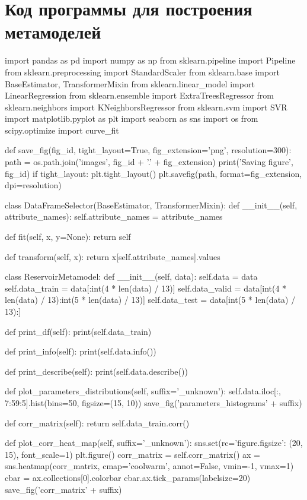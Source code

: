\chapter{Код программы для построения метамоделей}\label{appendix-MikTeX-TexStudio}

\begin{pythoncode}
import pandas as pd
import numpy as np
from sklearn.pipeline import Pipeline
from sklearn.preprocessing import StandardScaler
from sklearn.base import BaseEstimator, TransformerMixin
from sklearn.linear_model import LinearRegression
from sklearn.ensemble import ExtraTreesRegressor
from sklearn.neighbors import KNeighborsRegressor
from sklearn.svm import SVR
import matplotlib.pyplot as plt
import seaborn as sns
import os
from scipy.optimize import curve_fit


def save_fig(fig_id, tight_layout=True, fig_extension='png', resolution=300):
    path = os.path.join('images', fig_id + '.' + fig_extension)
    print('Saving figure', fig_id)
    if tight_layout:
        plt.tight_layout()
    plt.savefig(path, format=fig_extension, dpi=resolution)


class DataFrameSelector(BaseEstimator, TransformerMixin):
    def __init__(self, attribute_names):
        self.attribute_names = attribute_names

    def fit(self, x, y=None):
        return self

    def transform(self, x):
        return x[self.attribute_names].values


class ReservoirMetamodel:
    def __init__(self, data):
        self.data = data
        self.data_train = data[:int(4 * len(data) / 13)]
        self.data_valid = data[int(4 * len(data) / 13):int(5 * len(data) / 13)]
        self.data_test = data[int(5 * len(data) / 13):]

    def print_df(self):
        print(self.data_train)

    def print_info(self):
        print(self.data.info())

    def print_describe(self):
        print(self.data.describe())

    def plot_parameters_distributions(self, suffix='_unknown'):
        self.data.iloc[:, 7:59:5].hist(bins=50, figsize=(15, 10))
        save_fig('parameters_histograms' + suffix)

    def corr_matrix(self):
        return self.data_train.corr()

    def plot_corr_heat_map(self, suffix='_unknown'):
        sns.set(rc={'figure.figsize': (20, 15)}, font_scale=1)
        plt.figure()
        corr_matrix = self.corr_matrix()
        ax = sns.heatmap(corr_matrix, cmap='coolwarm',
                         annot=False, vmin=-1, vmax=1)
        cbar = ax.collections[0].colorbar
        cbar.ax.tick_params(labelsize=20)
        save_fig('corr_matrix' + suffix)


\end{pythoncode}
